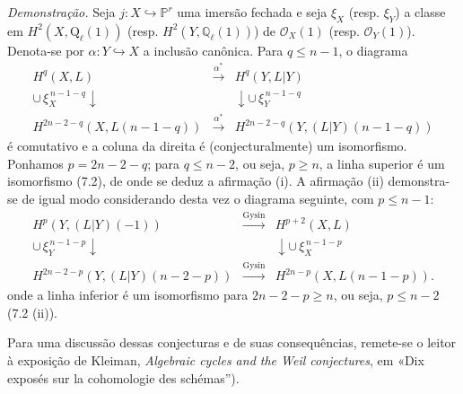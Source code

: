\emph{Demonstração.} Seja $j:X\hookrightarrow\mathbb P^r$ uma imersão fechada e seja $\xi_X$ (resp. $\xi_Y$) a classe em $H^2(X,\mathrm Q_\ell(1))$ (resp. $H^2(Y,\mathbb Q_\ell(1))$) de $\mathcal O_X(1)$ (resp. $\mathcal O_Y(1)$). Denota-se por $\alpha:Y\hookrightarrow X$ a inclusão canônica. Para $q\le n-1$, o diagrama
\[
\begin{array}{ccc}
H^q(X,L)&\xrightarrow{\alpha^*}&H^q(Y,L|Y)\\
\cup\,\xi_X^{\,n-1-q}\downarrow&&\downarrow\cup\,\xi_Y^{\,n-1-q}\\
H^{2n-2-q}(X,L(n-1-q))&\xrightarrow{\alpha^*}&
H^{2n-2-q}(Y,(L|Y)(n-1-q))
\end{array}
\]
é comutativo e a coluna da direita é (conjecturalmente) um isomorfismo. Ponhamos $p=2n-2-q$; para $q\le n-2$, ou seja, $p\ge n$, a linha superior é um isomorfismo (7.2), de onde se deduz a afirmação (i). A afirmação (ii) demonstra-se de igual modo considerando desta vez o diagrama seguinte, com $p\le n-1$:
\[
\begin{array}{ccc}
H^p(Y,(L|Y)(-1))&\xrightarrow{\mathrm{Gysin}}&H^{p+2}(X,L)\\
\cup\,\xi_Y^{\,n-1-p}\downarrow&&\downarrow\cup\,\xi_X^{\,n-1-p}\\
H^{2n-2-p}(Y,(L|Y)(n-2-p))&\xrightarrow{\mathrm{Gysin}}&
H^{2n-p}(X,L(n-1-p)).
\end{array}
\]
onde a linha inferior é um isomorfismo para $2n-2-p\ge n$, ou seja, $p\le n-2$ (7.2 (ii)).

Para uma discussão dessas conjecturas e de suas consequências, remete-se o leitor à exposição de Kleiman, \emph{Algebraic cycles and the Weil conjectures}, em «Dix exposés sur la cohomologie des schémas'').
